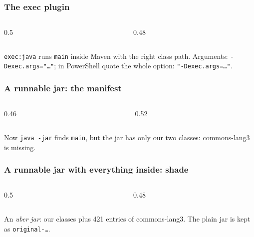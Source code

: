 \documentclass[aspectratio=169,10pt,compress]{beamer}
\begin{document}
\begin{frame}[t,fragile] \frametitle{The exec plugin}
  \begin{columns}[T]
    \begin{column}{0.5\textwidth}
    \end{column}
    \begin{column}{0.48\textwidth}
    \end{column}
  \end{columns}
  \vspace{0.3em}
  \small \texttt{exec:java} runs \texttt{main} inside Maven with the right class path. Arguments: \texttt{-Dexec.args="\dots"}; in PowerShell quote the whole option: \texttt{"-Dexec.args=\dots"}.
\end{frame}




\begin{frame}[t,fragile] \frametitle{A runnable jar: the manifest}
  \begin{columns}[T]
    \begin{column}{0.46\textwidth}
    \end{column}
    \begin{column}{0.52\textwidth}
    \end{column}
  \end{columns}
  \vspace{0.3em}
  \small Now \texttt{java -jar} finds \texttt{main}, but the jar has only our two classes: commons-lang3 is missing.
\end{frame}




\begin{frame}[t,fragile] \frametitle{A runnable jar with everything inside: shade}
  \begin{columns}[T]
    \begin{column}{0.5\textwidth}
    \end{column}
    \begin{column}{0.48\textwidth}
    \end{column}
  \end{columns}
  \vspace{0.3em}
  \small An \emph{uber jar}: our classes plus 421 entries of commons-lang3. The plain jar is kept as \texttt{original-\dots}.
\end{frame}
\end{document}
